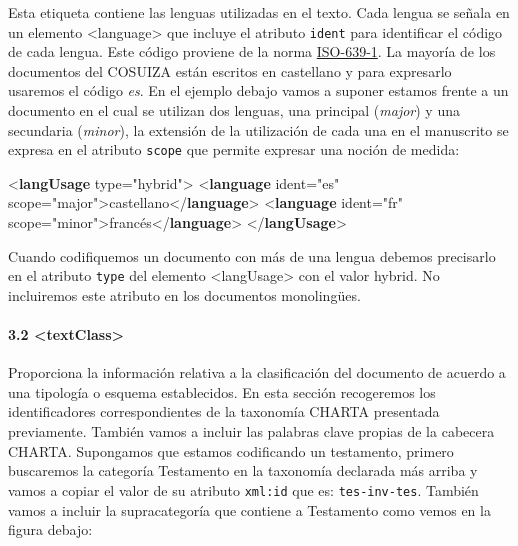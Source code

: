 \documentclass[
]{book}
\newenvironment{Shaded}{\begin{snugshade}}{\end{snugshade}}
\newcommand{\KeywordTok}[1]{\textcolor[rgb]{0.13,0.29,0.53}{\textbf{#1}}}
\newcommand{\NormalTok}[1]{#1}
\newcommand{\OtherTok}[1]{\textcolor[rgb]{0.56,0.35,0.01}{#1}}
\newcommand{\StringTok}[1]{\textcolor[rgb]{0.31,0.60,0.02}{#1}}
\begin{document}
Esta etiqueta contiene las lenguas utilizadas en el texto. Cada lengua se señala en un elemento { \textless language\textgreater{} } que incluye el atributo \texttt{ident} para identificar el código de cada lengua. Este código proviene de la norma \href{https://fr.wikipedia.org/wiki/Liste_des_codes_ISO_639-1}{ISO-639-1}. La mayoría de los documentos del COSUIZA están escritos en castellano y para expresarlo usaremos el código \emph{es}. En el ejemplo debajo vamos a suponer estamos frente a un documento en el cual se utilizan dos lenguas, una principal (\emph{major}) y una secundaria (\emph{minor}), la extensión de la utilización de cada una en el manuscrito se expresa en el atributo \texttt{scope} que permite expresar una noción de medida:

\begin{Shaded}
\begin{Highlighting}[]
\NormalTok{\textless{}}\KeywordTok{langUsage}\OtherTok{ type=}\StringTok{"hybrid"}\NormalTok{\textgreater{}}
\NormalTok{  \textless{}}\KeywordTok{language}\OtherTok{ ident=}\StringTok{"es"}\OtherTok{ scope=}\StringTok{"major"}\NormalTok{\textgreater{}castellano\textless{}/}\KeywordTok{language}\NormalTok{\textgreater{}}
\NormalTok{  \textless{}}\KeywordTok{language}\OtherTok{ ident=}\StringTok{"fr"}\OtherTok{ scope=}\StringTok{"minor"}\NormalTok{\textgreater{}francés\textless{}/}\KeywordTok{language}\NormalTok{\textgreater{} }
\NormalTok{\textless{}/}\KeywordTok{langUsage}\NormalTok{\textgreater{}}
\end{Highlighting}
\end{Shaded}

Cuando codifiquemos un documento con más de una lengua debemos precisarlo en el atributo \texttt{type} del elemento { \textless langUsage\textgreater{} } con el valor hybrid. No incluiremos este atributo en los documentos monolingües.

\hypertarget{textclass}{%
\paragraph*{\texorpdfstring{3.2 { \textless textClass\textgreater{} }}{3.2  \textless textClass\textgreater{} }}\label{textclass}}

Proporciona la información relativa a la clasificación del documento de acuerdo a una tipología o esquema establecidos. En esta sección recogeremos los identificadores correspondientes de la taxonomía CHARTA presentada previamente. También vamos a incluir las palabras clave propias de la cabecera CHARTA. Supongamos que estamos codificando un testamento, primero buscaremos la categoría Testamento en la taxonomía declarada más arriba y vamos a copiar el valor de su atributo \texttt{xml:id} que es: \texttt{tes-inv-tes}. También vamos a incluir la supracategoría que contiene a Testamento como vemos en la figura debajo:
\end{document}
